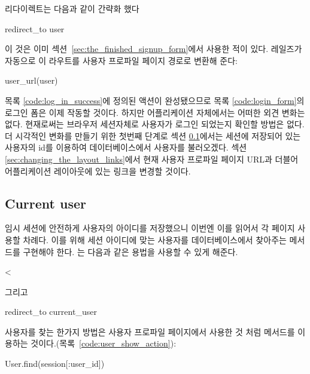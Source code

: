 \noindent 리다이렉트는 다음과 같이 간략화 했다 

\begin{code} redirect_to user \end{code} 

\noindent 이 것은 이미 섹션~\ref{sec:the_finished_signup_form}에서 사용한 적이 있다. 레일즈가 자동으로 이 라우트를 사용자 프로파일 페이지 경로로 변환해 준다: 

\begin{code} user_url(user) \end{code} 

목록 \ref{code:log_in_success}에 정의된  액션이 완성됐으므로 목록 \ref{code:login_form}의 로그인 폼은 이제 작동할 것이다. 하지만 어플리케이션 자체에서는 어떠한 외견 변화는 없다. 현재로써는 브라우저 세션자체로 사용자가 로그인 되었는지 확인할 방법은 없다. 더 시각적인 변화를 만들기 위한 첫번째 단계로 섹션 \ref{sec:current_user}에서는 세션에 저장되어 있는 사용자의 id를 이용하여 데이터베이스에서 사용자를 불러오겠다. 섹션 \ref{sec:changing_the_layout_links}에서 현재 사용자 프로파일 페이지 URL과 더블어 어플리케이션 레이아웃에 있는 링크을 변경할 것이다. 

\subsection{Current user} \label{sec:current_user} 

임시 세션에 안전하게 사용자의 아이디를 저장했으니 이번엔 이를 읽어서 각 페이지 사용할 차례다. 이를 위해 세션 아이디에 맞는 사용자를 데이터베이스에서 찾아주는 메서드를 구현해야 한다. 는 다음과 같은 용법을 사용할 수 있게 해준다. 

\begin{code} < \end{code} 

\noindent 그리고 

\begin{code} redirect_to current_user \end{code} 

사용자를 찾는 한가지 방법은 사용자 프로파일 페이지에서 사용한 것 처럼 메서드를 이용하는 것이다.(목록~\ref{code:user_show_action}): 

\begin{code} User.find(session[:user_id]) \end{code} 

